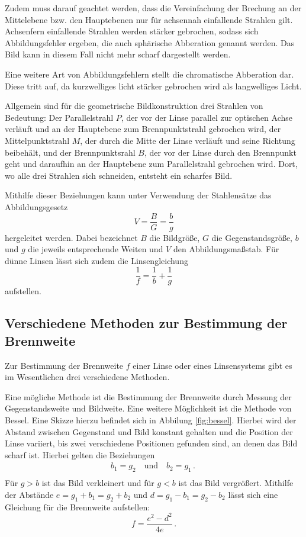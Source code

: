 Zudem muss darauf geachtet werden, dass die Vereinfachung der Brechung an der
Mittelebene bzw. den Hauptebenen nur für achsennah einfallende Strahlen gilt. Achsenfern
einfallende Strahlen werden stärker gebrochen, sodass sich Abbildungsfehler ergeben,
die auch sphärische Abberation genannt werden. Das Bild kann in diesem Fall nicht mehr scharf
dargestellt werden.

Eine weitere Art von Abbildungsfehlern stellt die chromatische Abberation dar. Diese
tritt auf, da kurzwelliges licht stärker gebrochen wird als langwelliges Licht.

Allgemein sind für die geometrische Bildkonstruktion drei Strahlen von Bedeutung:
Der Parallelstrahl $P$, der vor der Linse parallel zur optischen Achse verläuft und an
der Hauptebene zum Brennpunktstrahl gebrochen wird, der Mittelpunktstrahl $M$, der
durch die Mitte der Linse verläuft und seine Richtung beibehält, und der Brennpunktsrahl
$B$, der vor der Linse durch den Brennpunkt geht und daraufhin an der Hauptebene zum Parallelstrahl
gebrochen wird. Dort, wo alle drei Strahlen sich schneiden, entsteht ein scharfes Bild.

Mithilfe dieser Beziehungen kann unter Verwendung der Stahlensätze das Abbildungsgesetz
\begin{equation}
  V=\frac{B}{G}=\frac{b}{g}
  \label{eqn:V}
\end{equation}
hergeleitet werden. Dabei bezeichnet $B$ die Bildgröße, $G$ die Gegenstandsgröße,
$b$ und $g$ die jeweils entsprechende Weiten und $V$ den Abbildungsmaßstab.
Für dünne Linsen lässt sich zudem die Linsengleichung
\begin{equation}
  \frac{1}{f}=\frac{1}{b}+\frac{1}{g}
  \label{eqn:linsengleichung}
\end{equation}
aufstellen.


\subsection{Verschiedene Methoden zur Bestimmung der Brennweite}
\label{subsec:Methoden}

Zur Bestimmung der Brennweite $f$ einer Linse oder eines Linsensystems gibt es im
Wesentlichen drei verschiedene Methoden.

Eine mögliche Methode ist die Bestimmung der Brennweite durch Messung der Gegenstandsweite
und Bildweite.
Eine weitere Möglichkeit ist die Methode von Bessel. Eine Skizze hierzu befindet sich in
Abbilung \ref{fig:bessel}. Hierbei wird der Abstand zwischen
Gegenstand und Bild konstant gehalten und die Position der Linse variiert, bis zwei
verschiedene Positionen gefunden sind, an denen das Bild scharf ist. Hierbei gelten die
Beziehungen
\begin{align}
  b_1=g_2 \quad \text{und} \quad b_2=g_1\,.\ \\
  \label{eqn:d}
\end{align}
Für $g>b$ ist das Bild verkleinert und für $g<b$ ist das Bild vergrößert. Mithilfe der
Abstände $e=g_1+b_1=g_2+b_2$ und $d=g_1-b_1=g_2-b_2$ lässt sich eine Gleichung für die
Brennweite aufstellen:
\begin{equation}
  f=\frac{e^2-d^2}{4e} \,.
  \label{eqn:bessel}
\end{equation}

